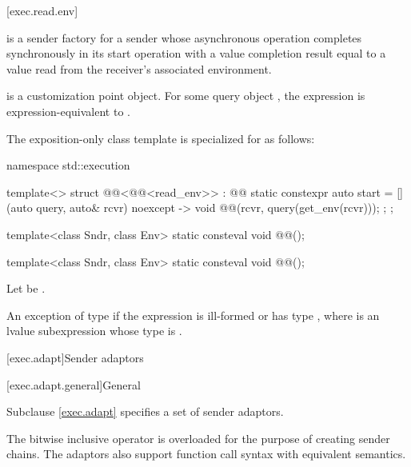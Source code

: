 [exec.read.env]{}

\pnum
{} is a sender factory for a sender
whose asynchronous operation completes synchronously in its start operation
with a value completion result equal to
a value read from the receiver's associated environment.

\pnum
{} is a customization point object.
For some query object ,
the expression  is expression-equivalent to
.

\pnum
The exposition-only class template 
is specialized for  as follows:
\begin{codeblock}
namespace std::execution {
  template<>
  struct @@<@@<read_env>> : @@ {
    static constexpr auto start =
      [](auto query, auto& rcvr) noexcept -> void {
        @@(rcvr, query(get_env(rcvr)));
      };
  };

  template<class Sndr, class Env>
    static consteval void @@();
}
\end{codeblock}

\begin{itemdecl}
template<class Sndr, class Env>
  static consteval void @@();
\end{itemdecl}

\begin{itemdescr}
\pnum
Let  be .

\pnum
\throws
An exception of type
 if
the expression  is ill-formed or has type , where
 is an lvalue subexpression whose type is .
\end{itemdescr}

[exec.adapt]{Sender adaptors}

[exec.adapt.general]{General}

\pnum
Subclause \ref{exec.adapt} specifies a set of sender adaptors.

\pnum
The bitwise inclusive  operator is overloaded
for the purpose of creating sender chains.
The adaptors also support function call syntax with equivalent semantics.

